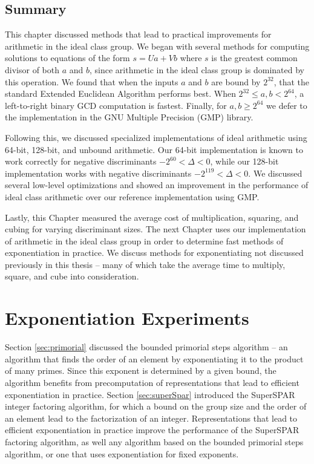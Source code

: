 \documentclass{ucalgthes1}
\theoremstyle{definition}
\begin{document}
\section{Summary}

This chapter discussed methods that lead to practical improvements for arithmetic in the ideal class group.  We began with several methods for computing solutions to equations of the form $s=Ua + Vb$ where $s$ is the greatest common divisor of both $a$ and $b$, since arithmetic in the ideal class group is dominated by this operation.  We found that when the inputs $a$ and $b$ are bound by $2^{32}$, that the standard Extended Euclidean Algorithm performs best.  When $2^{32} \le a,b < 2^{64}$, a left-to-right binary GCD computation is fastest.  Finally, for $a,b \ge 2^{64}$ we defer to the implementation in the GNU Multiple Precision (GMP) library.

Following this, we discussed specialized implementations of ideal arithmetic using 64-bit, 128-bit, and unbound arithmetic.  Our 64-bit implementation is known to work correctly for negative discriminants $-2^{60} < \Delta < 0$, while our 128-bit implementation works with negative discriminants $-2^{119} < \Delta < 0$. We discussed several low-level optimizations and showed an improvement in the performance of ideal class arithmetic over our reference implementation using GMP.

Lastly, this Chapter measured the average cost of multiplication, squaring, and cubing for varying discriminant sizes.  The next Chapter uses our implementation of arithmetic in the ideal class group in order to determine fast methods of exponentiation in practice.  We discuss methods for exponentiating not discussed previously in this thesis -- many of which take the average time to multiply, square, and cube into consideration.


\chapter{Exponentiation Experiments}
\label{chap:powExperiments}


Section \ref{sec:primorial} discussed the bounded primorial steps algorithm -- an algorithm that finds the order of an element by exponentiating it to the product of many primes.  Since this exponent is determined by a given bound, the algorithm benefits from precomputation of representations that lead to efficient exponentiation in practice.  Section \ref{sec:superSpar} introduced the SuperSPAR integer factoring algorithm, for which a bound on the group size and the order of an element lead to the factorization of an integer.  Representations that lead to efficient exponentiation in practice improve the performance of the SuperSPAR factoring algorithm, as well any algorithm based on the bounded primorial steps algorithm, or one that uses exponentiation for fixed exponents.
\end{document}
